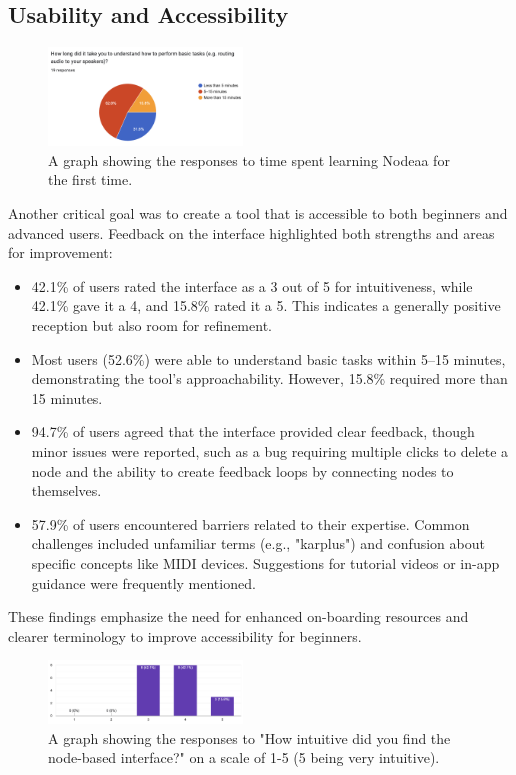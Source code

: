 \documentclass[10pt,twocolumn]{article}
\begin{document}
\subsection{Usability and Accessibility}
\begin{figure}[ht]
    \centering
    \includegraphics[width=0.46\textwidth]{images/surveytime.png}
    \caption{A graph showing the responses to time spent learning Nodeaa for the first time.}
    \label{fig:surveytime}
\end{figure}
Another critical goal was to create a tool that is accessible to both beginners and advanced users. Feedback on the interface highlighted both strengths and areas for improvement:
\begin{itemize}
    \item 42.1\% of users rated the interface as a 3 out of 5 for intuitiveness, while 42.1\% gave it a 4, and 15.8\% rated it a 5. This indicates a generally positive reception but also room for refinement.
    \item Most users (52.6\%) were able to understand basic tasks within 5–15 minutes, demonstrating the tool’s approachability. However, 15.8\% required more than 15 minutes.
    \item 94.7\% of users agreed that the interface provided clear feedback, though minor issues were reported, such as a bug requiring multiple clicks to delete a node and the ability to create feedback loops by connecting nodes to themselves.
    \item 57.9\% of users encountered barriers related to their expertise. Common challenges included unfamiliar terms (e.g., "karplus") and confusion about specific concepts like MIDI devices. Suggestions for tutorial videos or in-app guidance were frequently mentioned.
\end{itemize}
These findings emphasize the need for enhanced on-boarding resources and clearer terminology to improve accessibility for beginners.

\begin{figure}[ht]
    \centering
    \includegraphics[width=0.46\textwidth]{images/surveyinterface.png}
    \caption{A graph showing the responses to "How intuitive did you find the node-based interface?" on a scale of 1-5 (5 being very intuitive).}
    \label{fig:surveyinterface}
\end{figure}
\end{document}
